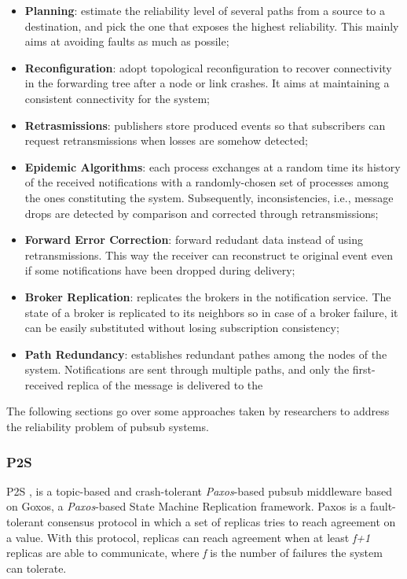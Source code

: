 \begin{itemize}
  \item \textbf{Planning}: estimate the reliability level of several paths from a source to a destination, and pick the one that exposes the highest reliability. This mainly aims at avoiding faults as much as possile;
  \item \textbf{Reconfiguration}: adopt topological reconfiguration to recover connectivity in the forwarding tree after a node or link crashes. It aims at maintaining a consistent connectivity for the system;
  \item \textbf{Retrasmissions}: publishers store produced events so that subscribers can request retransmissions when losses are somehow detected;
  \item \textbf{Epidemic Algorithms}: each process exchanges at a random time its history of the received notifications with a randomly-chosen set of processes among the ones constituting the system. Subsequently, inconsistencies, i.e., message drops are detected by comparison and corrected through retransmissions;
  \item \textbf{Forward Error Correction}: forward redudant data instead of using retransmissions. This way the receiver can reconstruct te original event even if some notifications have been dropped during delivery;
  \item \textbf{Broker Replication}: replicates the brokers in the notification service. The state of a broker is replicated to its neighbors so in case of a broker failure, it can be easily substituted without losing subscription consistency;
  \item \textbf{Path Redundancy}: establishes redundant pathes among the nodes of the system. Notifications are sent through multiple paths, and only the first-received replica of the message is delivered to the   
\end{itemize}

The following sections go over some approaches taken by researchers to address the reliability problem of \gls{pubsub} systems.

\subsubsection{P2S}
\label{sec:p2s}

P2S \cite{p2s}, is a topic-based and crash-tolerant \textit{Paxos}-based \gls{pubsub} middleware based on Goxos, a \textit{Paxos}-based State Machine Replication framework. Paxos is a fault-tolerant consensus protocol in which a set of replicas tries to reach agreement on a value. With this protocol, replicas can reach agreement when at least \textit{f+1} replicas are able to communicate, where \textit{f} is the number of failures the system can tolerate.


